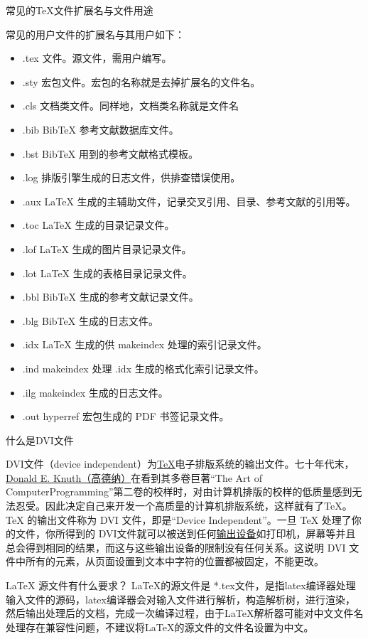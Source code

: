 \begin{faq}{常见的TeX文件扩展名与文件用途}

  常见的用户文件的扩展名与其用户如下：
  \begin{itemize}
    \item .tex 文件。源文件，需用户编写。
    \item .sty 宏包文件。宏包的名称就是去掉扩展名的文件名。
    \item .cls 文档类文件。同样地，文档类名称就是文件名
    \item .bib BibTeX 参考文献数据库文件。
    \item .bst BibTeX 用到的参考文献格式模板。
    \item .log 排版引擎生成的日志文件，供排查错误使用。
    \item .aux LaTeX 生成的主辅助文件，记录交叉引用、目录、参考文献的引用等。
    \item .toc LaTeX 生成的目录记录文件。
    \item .lof LaTeX 生成的图片目录记录文件。
    \item .lot LaTeX 生成的表格目录记录文件。
    \item .bbl BibTeX 生成的参考文献记录文件。
    \item .blg BibTeX 生成的日志文件。
    \item .idx LaTeX 生成的供 makeindex 处理的索引记录文件。
    \item .ind makeindex 处理 .idx 生成的格式化索引记录文件。
    \item .ilg makeindex 生成的日志文件。
    \item .out hyperref 宏包生成的 PDF 书签记录文件。
  \end{itemize}

\end{faq}

\begin{faq}{什么是DVI文件}

  DVI文件（device independent）为\href{https://baike.baidu.com/item/TeX}{TeX}电子排版系统的输出文件。七十年代末，\href{https://baike.baidu.com/item/Donald%20E.%20Knuth}{Donald E. Knuth（高德纳）}在看到其多卷巨著“The Art of ComputerProgramming”第二卷的校样时，对由计算机排版的校样的低质量感到无法忍受。因此决定自己来开发一个高质量的计算机排版系统，这样就有了TeX。TeX 的输出文件称为 DVI 文件，即是“Device Independent”。一旦 TeX 处理了你的文件，你所得到的 DVI文件就可以被送到任何\href{https://baike.baidu.com/item/%E8%BE%93%E5%87%BA%E8%AE%BE%E5%A4%87}{输出设备}如打印机，屏幕等并且总会得到相同的结果，而这与这些输出设备的限制没有任何关系。这说明 DVI 文件中所有的元素，从页面设置到文本中字符的位置都被固定，不能更改。

\end{faq}

\begin{faq}{\LaTeX{} 源文件有什么要求？}
  LaTeX的源文件是 *.tex文件，是指latex编译器处理输入文件的源码，latex编译器会对输入文件进行解析，构造解析树，进行渲染，然后输出处理后的文档，完成一次编译过程，由于LaTeX解析器可能对中文文件名处理存在兼容性问题，不建议将LaTeX的源文件的文件名设置为中文。
\end{faq}
